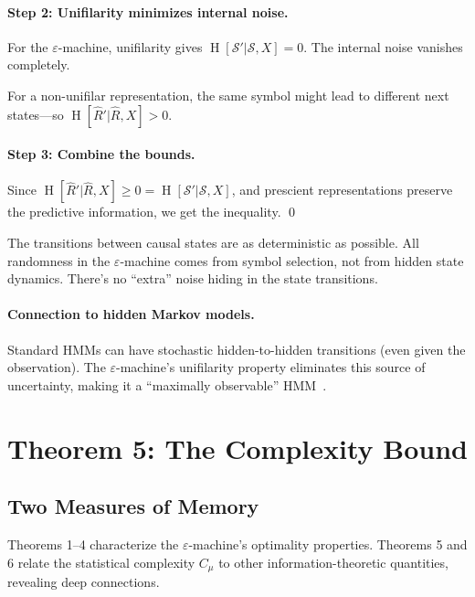 \documentclass[11pt,a4paper]{article}
\theoremstyle{definition}
\theoremstyle{plain}
\newcommand{\eps}{\varepsilon}
\newcommand{\Cmu}{C_\mu}
\newcommand{\calS}{\mathcal{S}}
\DeclareMathOperator{\Ent}{H}
\begin{document}
\paragraph{Step 2: Unifilarity minimizes internal noise.}
For the $\eps$-machine, unifilarity gives $\Ent[\calS' | \calS, X] = 0$. The internal noise vanishes completely.

For a non-unifilar representation, the same symbol might lead to different next states---so $\Ent[\hat{R}' | \hat{R}, X] > 0$.

\paragraph{Step 3: Combine the bounds.}
Since $\Ent[\hat{R}' | \hat{R}, X] \geq 0 = \Ent[\calS' | \calS, X]$, and prescient representations preserve the predictive information, we get the inequality. \qed

\begin{intuition}
The transitions between causal states are as deterministic as possible. All randomness in the $\eps$-machine comes from symbol selection, not from hidden state dynamics. There's no ``extra'' noise hiding in the state transitions.
\end{intuition}

\paragraph{Connection to hidden Markov models.} Standard HMMs can have stochastic hidden-to-hidden transitions (even given the observation). The $\eps$-machine's unifilarity property eliminates this source of uncertainty, making it a ``maximally observable'' HMM~\cite{rabiner1989tutorial}.

\section{Theorem 5: The Complexity Bound}
\label{sec:theorem-bound}

\subsection{Two Measures of Memory}

Theorems 1--4 characterize the $\eps$-machine's optimality properties. Theorems 5 and 6 relate the statistical complexity $\Cmu$ to other information-theoretic quantities, revealing deep connections.
\end{document}
